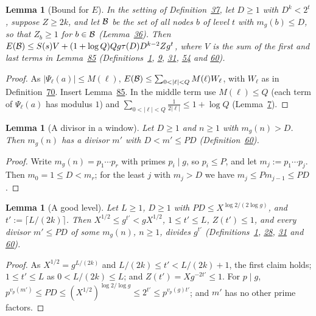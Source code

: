 \documentclass[11pt]{article}
\newcounter{hffc}
\theoremstyle{definition}\newtheorem{hffdef}[hffc]{Definition}
\theoremstyle{plain}\newtheorem{hfflem}[hffc]{Lemma}\newtheorem{hffthm}[hffc]{Theorem}
\theoremstyle{remark}\newtheorem{hffrem}[hffc]{Remark}
\newcommand{\hffcost}{}
\newcommand{\setcost}[1]{\renewcommand{\hffcost}{#1}}
\begin{document}
\begin{hfflem}[Bound for $E$]\label{L:E}
In the setting of Definition~\hyperref[D:phase]{37}, let $D\ge1$ with $D^k<2^t$, suppose $Z\ge2k$, and let $\mathcal{B}$ be the set of all nodes $b$ of level $t$ with $m_g(b)\le D$, so that $Z_b\ge1$ for $b\in\mathcal{B}$ (Lemma~\hyperref[L:nonempty]{36}). Then $E(\mathcal{B})\le S(s)V+(1+\log Q)Qg\tau(D)D^{k-2}Zg^t$, where $V$ is the sum of the first and last terms in Lemma~\hyperref[L:W]{85} (Definitions~\hyperref[D:conv]{1}, \hyperref[D:psi]{9}, \hyperref[D:node]{31}, \hyperref[D:err]{54} and \hyperref[D:gpart]{60}).
\par\nopagebreak{}
\end{hfflem}
\begin{proof}\setcost{length 154/300}As $|\Psi_\ell(a)|\le M(\ell)$, $E(\cB)\le\sum_{0<|\ell|<Q}M(\ell)W_\ell$, with $W_\ell$ as in Definition~\hyperref[D:count]{70}. Insert Lemma~\hyperref[L:W]{85}. In the middle term use $M(\ell)\le Q$ (each term of $\Psi_\ell(a)$ has modulus $1$) and $\sum_{0<|\ell|<Q}\frac1{2|\ell|}\le1+\log Q$ (Lemma~\hyperref[L:harm1]{7}).
\end{proof}

\begin{hfflem}[A divisor in a window]\label{L:mdiv}
Let $D\ge1$ and $n\ge1$ with $m_g(n)>D$. Then $m_g(n)$ has a divisor $m'$ with $D<m'\le PD$ (Definition~\hyperref[D:gpart]{60}).
\par\nopagebreak{}
\end{hfflem}
\begin{proof}\setcost{length 110/300}Write $m_g(n)=p_1\cdots p_r$ with primes $p_i\mid g$, so $p_i\le P$, and let $m_j:=p_1\cdots p_j$. Then $m_0=1\le D<m_r$; for the least $j$ with $m_j>D$ we have $m_j\le Pm_{j-1}\le PD$.
\end{proof}

\begin{hfflem}[A good level]\label{L:level}
Let $L\ge1$, $D\ge1$ with $PD\le X^{\log2/(2\log g)}$, and $t':=\lceil L/(2k)\rceil$. Then $X^{1/2}\le g^{t'}<gX^{1/2}$, $1\le t'\le L$, $Z(t')\le1$, and every divisor $m'\le PD$ of some $m_g(n)$, $n\ge1$, divides $g^{t'}$ (Definitions~\hyperref[D:conv]{1}, \hyperref[D:pal]{28}, \hyperref[D:node]{31} and \hyperref[D:gpart]{60}).
\par\nopagebreak{}
\end{hfflem}
\begin{proof}\setcost{length 167/300}As $X^{1/2}=g^{L/(2k)}$ and $L/(2k)\le t'<L/(2k)+1$, the first claim holds; $1\le t'\le L$ as $0<L/(2k)\le L$; and $Z(t')=Xg^{-2t'}\le1$. For $p\mid g$, $p^{v_p(m')}\le PD\le(X^{1/2})^{\log2/\log g}\le2^{t'}\le p^{v_p(g)t'}$; and $m'$ has no other prime factors.
\end{proof}
\end{document}
